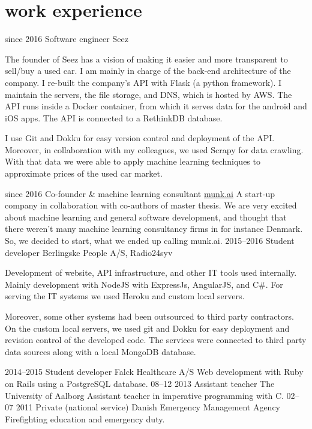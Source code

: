 \documentclass[]{friggeri-cv}
\begin{document}
\section{work experience}

\begin{entrylist}
  \entry
    {since 2016}
    {Software engineer}
    {Seez}
    {
      The founder of Seez has a vision of making it easier and more transparent to sell/buy a used car.
      I am mainly in charge of the back-end architecture of the company.
      I re-built the company's API with Flask (a python framework).
      I maintain the servers, the file storage, and DNS, which is hosted by AWS. 
      The API runs inside a Docker container, from which it serves data for the android and iOS apps.
      The API is connected to a RethinkDB database.

      I use Git and Dokku for easy version control and deployment of the API.
      Moreover, in collaboration with my colleagues, we used Scrapy for data crawling.
      With that data we were able to apply machine learning techniques to approximate prices of the used car market.
	  }
  \entry
    {since 2016}
    {Co-founder \& machine learning consultant}
    {\href{http://www.munk.ai/}{munk.ai}}
    {
      A start-up company in collaboration with co-authors of master thesis.
      We are very excited about machine learning and general software development, and thought that there weren't many machine learning consultancy firms in for instance Denmark.
      So, we decided to start, what we ended up calling munk.ai.
    }
  \entry
    {2015--2016}
    {Student developer}
    {Berlingske People A/S, Radio24syv}
    {
      Development of website, API infrastructure, and other IT tools used internally. 
      Mainly development with NodeJS with ExpressJs, AngularJS, and C\#.
      For serving the IT systems we used Heroku and custom local servers.

      Moreover, some other systems had been outsourced to third party contractors.
      On the custom local servers, we used git and Dokku for easy deployment and revision control of the developed code.
      The services were connected to third party data sources along with a local MongoDB database.
    }
  \entry
    {2014--2015}
    {Student developer}
    {Falck Healthcare A/S}
    {
      Web development with Ruby on Rails using a PostgreSQL database.
    }
  \entry
    {08–12 2013}
    {Assistant teacher}
    {The University of Aalborg}
    {Assistant teacher in imperative programming with C.}
  \entry
    {02–07 2011}
    {Private (national service)}
    {Danish Emergency Management Agency}
    {Firefighting education and emergency duty.}
\end{entrylist}
\end{document}
